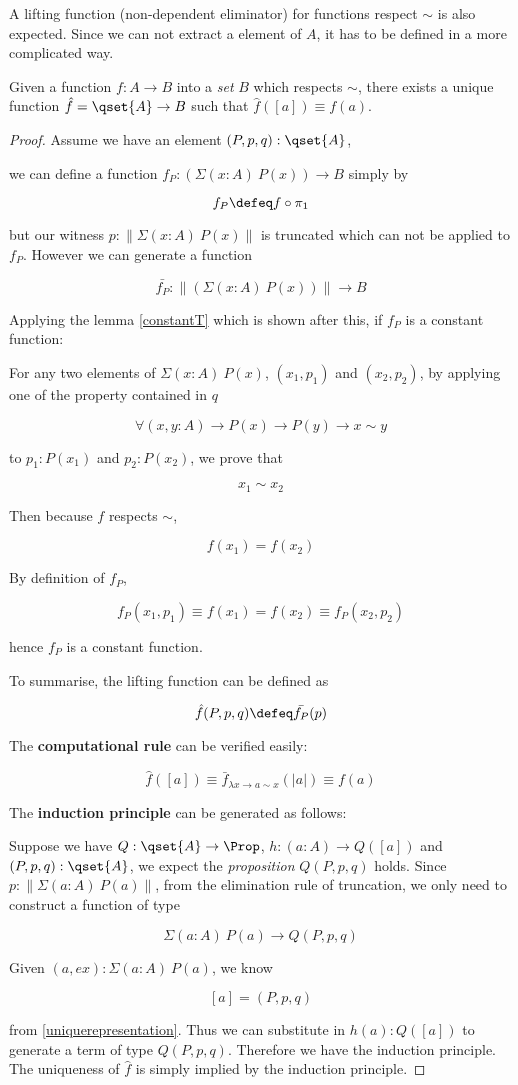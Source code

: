 A lifting function (non-dependent eliminator) for functions respect $\sim$ is also expected. Since we can not extract a element of $A$, it has to be defined in a more complicated way.

\begin{lemma}
Given a function $f : A \to B$ into a \emph{set} $B$ which respects $\sim$, there exists a unique function $\hat{f} = \qset{A} \to B$ such that $\hat{f} ([ a ]) \equiv f(a)$.
\end{lemma}
\begin{proof}
Assume we have an element $(P, p, q) : \qset{A}$,

we can define a function $f_{P} : (\Sigma (x : A) ~P(x)) \to B$ simply by 

$$f_{P} \defeq f \circ \pi_{1}$$

but our witness $p : \| \Sigma (x : A) ~P(x) \|$ is truncated which can not be applied to $f_{P}$. However we can generate a function

$$\bar{f_{P}} : \| (\Sigma (x : A) ~P(x)) \| \to B$$

Applying the lemma \ref{constantT} which is shown after this, if $f_{P}$ is a constant function:

For any two elements of $\Sigma (x : A) ~P(x)$, $(x_1,p_1)$ and $(x_2,p_2)$, by applying one of the property contained in $q$

$$\forall(x,y : A) \to P(x) \to P(y) \to x \sim y$$

to $p_1 : P(x_1)$ and $p_2 : P(x_2)$, we prove that 

$$x_1 \sim x_2$$

Then because $f$ respects $\sim$,

$$f(x_1) = f(x_2)$$

By definition of $f_P$,

$$f_P(x_1,p_1) \equiv f (x_1) = f(x_2) \equiv f_P(x_2,p_2)$$

hence $f_P$ is a constant function.


To summarise, the lifting function can be defined as

$$\hat{f}(P,p,q) \defeq \bar{f_{P}}(p)$$


The \textbf{computational rule} can be verified easily:

$$\hat{f}([a]) \equiv \bar{f}_{\lambda x \to a \sim x}(|a|) \equiv f(a)$$

The \textbf{induction principle} can be generated as follows:

Suppose we have $Q : \qset{A} \to \Prop$, $h : (a : A) \to Q([a])$ and $(P,p,q) : \qset{A}$, we expect the \emph{proposition} $Q(P,p,q)$ holds. Since $p : \| \Sigma (a : A) ~ P(a) \|$, from the elimination rule of truncation, we only need to construct a function of type

$$\Sigma (a : A) ~ P(a) \to Q(P,p,q)$$


Given $(a,ex) : \Sigma (a : A) ~ P(a)$, we know

$$[a] = (P,p,q)$$

from \ref{uniquerepresentation}. Thus we can substitute in $h(a) : Q([a])$ to generate a term of type $Q(P,p,q)$. Therefore we have the induction principle. The uniqueness of $\hat{f}$ is simply implied by the induction principle.
\end{proof}


